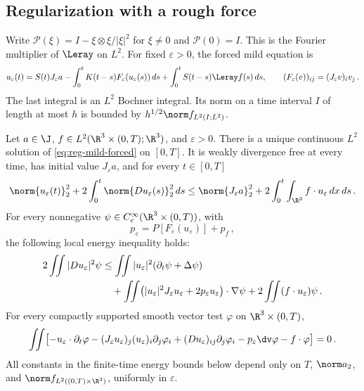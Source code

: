 \documentclass[11pt,reqno]{amsart}
\begin{document}
\subsection{Regularization with a rough force}

Write $\mathcal P(\xi)=I-\xi\otimes\xi/|\xi|^2$ for $\xi\ne0$ and
$\mathcal P(0)=I$. This is the Fourier multiplier of $\Leray$ on $L^2$.
For fixed $\varepsilon>0$, the forced mild equation is
\begin{equation}\label{eq:reg-mild-forced}
 u_\varepsilon(t)=S(t)J_\varepsilon a
 -\int_0^tK(t-s)F_\varepsilon(u_\varepsilon(s))\,ds
 +\int_0^t S(t-s)\Leray f(s)\,ds,
 \qquad
 (F_\varepsilon(v))_{ij}=(J_\varepsilon v)_i v_j\,.
\end{equation}
The last integral is an $L^2$ Bochner integral. Its norm on a time interval
$I$ of length at most $h$ is bounded by
$h^{1/2}\norm f_{L^2(I;L^2)}$.

\begin{lemma}\label{lem:regularised-forced}
Let $a\in\J$, $f\in L^2(\R^3\times(0,T);\R^3)$, and $\varepsilon>0$.
There is a unique continuous $L^2$ solution of
\eqref{eq:reg-mild-forced} on $[0,T]$. It is weakly divergence free at
every time, has initial value $J_\varepsilon a$, and for every $t\in[0,T]$
\begin{equation}\label{eq:reg-energy-forced}
 \norm{u_\varepsilon(t)}_2^2
 +2\int_0^t\norm{Du_\varepsilon(s)}_2^2\,ds
 \le \norm{J_\varepsilon a}_2^2
   +2\int_0^t\int_{\R^3} f\cdot u_\varepsilon\,dx\,ds\,.
\end{equation}
For every nonnegative $\psi\in C_c^\infty(\R^3\times(0,T))$, with
\[
 p_\varepsilon=P[F_\varepsilon(u_\varepsilon)]+p_f\,,
\]
the following local energy inequality holds:
\begin{align}\label{eq:reg-local-energy-forced}
 2\iint |Du_\varepsilon|^2\psi
 &\le \iint |u_\varepsilon|^2(\partial_t\psi+\Delta\psi)\notag\\
 &\quad+\iint\bigl(|u_\varepsilon|^2J_\varepsilon u_\varepsilon
          +2p_\varepsilon u_\varepsilon\bigr)\cdot\nabla\psi
       +2\iint(f\cdot u_\varepsilon)\psi\,.
\end{align}
For every compactly supported smooth vector test $\varphi$ on
$\R^3\times(0,T)$,
\begin{align}\label{eq:reg-momentum-forced}
 \iint\bigl[-u_\varepsilon\cdot\partial_t\varphi
 -(J_\varepsilon u_\varepsilon)_j(u_\varepsilon)_i\partial_j\varphi_i
 + (Du_\varepsilon)_{ij}\partial_j\varphi_i
 -p_\varepsilon\dv\varphi-f\cdot\varphi\bigr]=0\,.
\end{align}
All constants in the finite-time energy bounds below depend only on
$T$, $\norm a_2$, and $\norm f_{L^2((0,T)\times\R^3)}$, uniformly in
$\varepsilon$.
\end{lemma}
\end{document}
